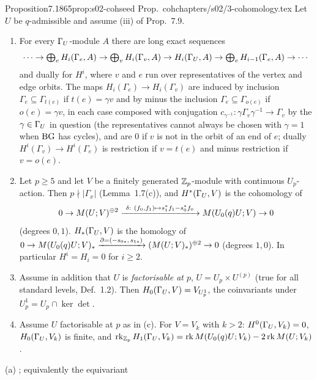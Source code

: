 \begin{quoted}{Proposition}{7.18}{65}{prop:s02-coh}{seed Prop.~coh}{chapters/s02/3-cohomology.tex}\label{rpt:prop:s02-coh}
Let $U$ be $q$-admissible and assume (iii) of Prop.~7.9.
\begin{enumerate}[label=(\alph*)]
\item For every $\Gamma_U$-module $A$ there are long exact sequences
  \[\cdots\to\textstyle\bigoplus_{e}H_i(\Gamma_e,A)\to\bigoplus_{v}H_i(\Gamma_v,A)\to H_i(\Gamma_U,A)\to
  \bigoplus_eH_{i-1}(\Gamma_e,A)\to\cdots\]
  and dually for $H^i$, where $v$ and $e$ run over representatives of the vertex and edge orbits. The maps
  $H_i(\Gamma_e)\to H_i(\Gamma_v)$ are induced by inclusion $\Gamma_e\subseteq\Gamma_{t(e)}$ if $t(e)=\gamma v$ and by minus the inclusion $\Gamma_e\subseteq\Gamma_{o(e)}$ if $o(e)=\gamma v$, in each case composed with conjugation $c_{\gamma^{-1}}:\gamma\Gamma_v\gamma^{-1}\to\Gamma_v$ by the $\gamma\in\Gamma_U$ in question (the representatives cannot always be chosen with $\gamma=1$ when $\mathrm{BG}$ has cycles), and are $0$ if $v$ is not in the orbit of an end of $e$;
  dually $H^i(\Gamma_v)\to H^i(\Gamma_e)$ is restriction if $v=t(e)$ and minus restriction if $v=o(e)$.
\item Let $p\ge5$ and let $V$ be a finitely generated $\mathbb{Z}_p$-module with continuous $U_p$-action. Then
  $p\nmid|\Gamma_x|$ (Lemma~1.7(c)), and $H^*(\Gamma_U,V)$ is the cohomology of
  \[0\to\Brandt{U}{V}^{\oplus2}\xrightarrow{\ \delta:\ (f_0,f_1)\mapsto s_1^*f_1-s_0^*f_0\ }\Brandt{\Uzero{q}U}{V}\to0\]
  (degrees $0,1$). $H_*(\Gamma_U,V)$ is the homology of
  $0\to M(U_0(q)U;V)_*\xrightarrow{\partial=(-s_{0*},\,s_{1*})}(M(U;V)_*)^{\oplus2}\to0$ (degrees $1,0$).
  In particular $H^i=H_i=0$ for $i\ge2$.
\item Assume in addition that $U$ is \emph{factorisable at $p$}, $U=U_p\times U^{(p)}$ (true for all standard levels,
  Def.~1.2). Then $H_0(\Gamma_U,V)=V_{U_p^1}$, the coinvariants under $U_p^1=U_p\cap\ker\det$.
\item Assume $U$ factorisable at $p$ as in (c). For $V=V_k$ with $k>2$: $H^0(\Gamma_U,V_k)=0$, $H_0(\Gamma_U,V_k)$ is finite, and
  $\operatorname{rk}_{\mathbb{Z}_p}H_1(\Gamma_U,V_k)=\operatorname{rk}M(U_0(q)U;V_k)-2\operatorname{rk}M(U;V_k)$.
\end{enumerate}
\par\smallskip{}\par
\noindent (a) \stcited{} \cite[II.2.8, Prop.~13 and Remark~1, pp.~126--127]{Se}; equivalently the equivariant

\end{quoted}

